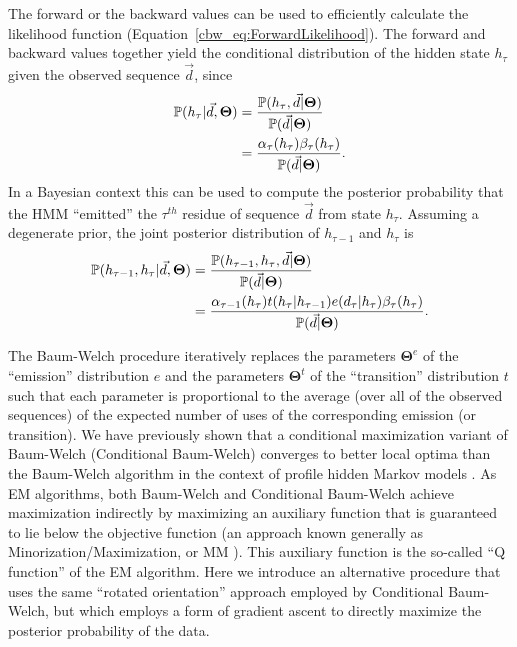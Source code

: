 \documentclass[preprint,12pt,authoryear]{elsarticle}
\newcommand{\Transition}{\ensuremath{t}}
\newcommand{\Emission}{\ensuremath{e}}
\newcommand{\Parameters}{\ensuremath{\bm{\Theta}}}
\newcommand{\TransitionParameters}{\Parameters^{\Transition}}
\newcommand{\EmissionParameters}{\Parameters^{\Emission}}
\newcommand{\datum}{\ensuremath{d}}
\newcommand{\hiddenState}{\ensuremath{h}}
\newcommand{\Time}{\ensuremath{\tau}}
\newcommand{\HMMtransitionLaw}{\ensuremath{t}}
\newcommand{\HMMemissionLaw}{\ensuremath{e}}
\newcommand{\forward}{\ensuremath{\alpha}}
\newcommand{\backward}{\ensuremath{\beta}}
\newcommand{\Prob}{\ensuremath{\mathbb P}}
\begin{document}
The forward or the backward values can be used to efficiently calculate the likelihood function (Equation~\ref{cbw_eq:ForwardLikelihood}).  The forward and backward values together yield the conditional distribution of the hidden state $\hiddenState_{\Time}$ given the observed sequence $\vec{\datum}$, since
\begin{equation*}
\begin{split}
\Prob( \hiddenState_{\Time} | \vec{\datum}, \Parameters )
 &= \frac{ \Prob( \hiddenState_{\Time}, \vec{\datum} | \Parameters ) }{\Prob( \vec{\datum} | \Parameters ) } \\
 &= \frac{ \forward_{\Time}( \hiddenState_{\Time} ) \backward_{\Time}( \hiddenState_{\Time} ) }{\Prob( \vec{\datum} | \Parameters ) } \hbox{.}
\end{split}
\end{equation*}
In a Bayesian context this can be used to compute the posterior probability that the HMM ``emitted'' the $\Time^{th}$ residue of sequence $\vec{\datum}$ from state $\hiddenState_{\Time}$. Assuming a degenerate prior, the joint posterior distribution of $\hiddenState_{\Time-1}$ and $\hiddenState_{\Time}$ is
\begin{equation*}
\begin{split}
\Prob( \hiddenState_{\Time-1}, \hiddenState_{\Time} | \vec{\datum}, \Parameters )
 &= \frac{ \Prob( \hiddenState_{\Time-1}, \hiddenState_{\Time}, \vec{\datum} | \Parameters ) }{\Prob( \vec{\datum} | \Parameters ) } \\
 &= \frac{ \forward_{\Time-1}( \hiddenState_{\Time} ) \HMMtransitionLaw( \hiddenState_{\Time} | \hiddenState_{\Time - 1} ) \HMMemissionLaw( \datum_{\Time} | \hiddenState_{\Time} ) \backward_{\Time}( \hiddenState_{\Time} ) }{ \Prob( \vec{\datum} | \Parameters ) } \hbox{.}
\end{split}
\end{equation*}

The Baum-Welch procedure iteratively replaces the parameters $\EmissionParameters$ of the ``emission'' distribution $\HMMemissionLaw$ and the parameters $\TransitionParameters$ of the ``transition'' distribution $\HMMtransitionLaw$ such that each parameter is proportional to the average (over all of the observed sequences) of the expected number of uses of the corresponding emission (or transition). We have previously shown that a conditional maximization variant of Baum-Welch (Conditional Baum-Welch) converges to better local optima than the Baum-Welch algorithm in the context of profile hidden Markov models \citep{edlefsen2010transposon}.  As EM algorithms, both Baum-Welch and Conditional Baum-Welch achieve maximization indirectly by maximizing an auxiliary function that is guaranteed to lie below the objective function (an approach known generally as Minorization/Maximization, or MM \citep{Hunter:2004}).  This auxiliary function is the so-called ``Q function'' of the EM algorithm.  Here we introduce an alternative procedure that uses the same ``rotated orientation'' approach employed by Conditional Baum-Welch, but which employs a form of gradient ascent to directly maximize the posterior probability of the data.
\end{document}
